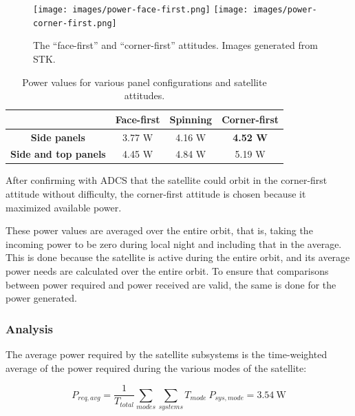 \documentclass[12pt]{article}
\begin{document}
			\begin{figure}[ht]%
\centering
\texttt{[image: images/power-face-first.png]}%
\hspace{0.5in}
\texttt{[image: images/power-corner-first.png]}
\caption{The ``face-first'' and ``corner-first'' attitudes.  Images generated from STK.}%
\label{fig:power-orientations}%
\end{figure}
			
			\begin{table}[ht]
\caption{Power values for various panel configurations and satellite attitudes.}
\label{tab:power-trade-study}
\begin{center}
    \begin{tabular}{|c|c|c|c|} \hline
    	 & \textbf{Face-first} & \textbf{Spinning} & \textbf{Corner-first} \\  \hline
\textbf{Side panels} & 3.77 W & 4.16 W & \textbf{4.52 W} \\\hline
\textbf{Side and top panels} & 4.45 W & 4.84 W & 5.19 W \\\hline
    \end{tabular}
\end{center}
\end{table}

After confirming with ADCS that the satellite could orbit in the corner-first attitude without difficulty, the corner-first attitude is chosen because it maximized available power.

These power values are averaged over the entire orbit, that is, taking the incoming power to be zero during local night and including that in the average.  This is done because the satellite is active during the entire orbit, and its average power needs are calculated over the entire orbit.  To ensure that comparisons between power required and power received are valid, the same is done for the power generated.
			
			\subsubsection{Analysis}\label{sec:power-analysis}
			
The average power required by the satellite subsystems is the time-weighted average of the power required during the various modes of the satellite:

\begin{equation}
P_{req,avg} = \frac{1}{T_{total}}\sum_{modes}{ \sum_{systems}{T_{mode} \: P_{sys,mode}} } = 3.54 \ \text{W} 
\label{eq:power-required}
\end{equation}
\end{document}
